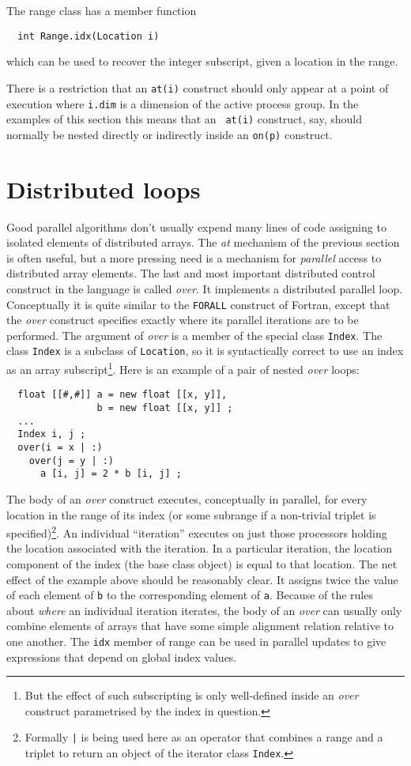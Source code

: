 The range class has a member function
\small
\begin{verbatim}
  int Range.idx(Location i)
\end{verbatim}
\normalsize
which can be used to recover the integer subscript, given a
location in the range.

There is a restriction that an {\tt at(i)} construct should only appear
at a point of execution where {\tt i.dim} is a dimension of the active
process group.  In the examples of this section this means that an {\tt
at(i)} construct, say, should normally be nested directly or indirectly
inside an {\tt on(p)} construct.

\section{Distributed loops}

Good parallel algorithms don't usually
expend many lines of code assigning to isolated elements of distributed
arrays.  The {\em at} mechanism of the previous section is
often useful, but a more pressing need is
a mechanism for {\em parallel} access to distributed array elements.
The last and most important distributed control construct in the language
is called {\em over}.
It implements a distributed parallel loop.  Conceptually it is quite
similar to the {\tt FORALL} construct of Fortran, except that the
{\em over} construct specifies exactly where its parallel iterations
are to be performed.
The argument of {\em over} is a member of the special class {\tt Index}.
The class {\tt Index} is a subclass of {\tt Location}, so it is syntactically
correct to use an index as an array subscript\footnote{But the effect
of such subscripting is only well-defined inside an {\em over} construct
parametrised by the index in question.}.  Here is an example of
a pair of nested {\em over} loops:
\small
\begin{verbatim}
  float [[#,#]] a = new float [[x, y]],
                b = new float [[x, y]] ;
  ...
  Index i, j ;
  over(i = x | :)
    over(j = y | :)
      a [i, j] = 2 * b [i, j] ;
\end{verbatim}
\normalsize
The body of an {\em over} construct executes, conceptually in parallel,
for every location in the range of its index (or some subrange if a
non-trivial triplet is specified)\footnote{Formally {\tt |} is being
used here as an operator that combines a range and a triplet to return
an object of the iterator class {\tt Index}.}.  An individual
``iteration'' executes on just those processors holding the location
associated with the iteration.  In a particular iteration, the location
component of the index (the base class object) is equal to that
location.  The net effect of the example above should be reasonably
clear.  It assigns twice the value of each element of {\tt b} to the
corresponding element of {\tt a}.  Because of the rules about {\em
where} an individual iteration iterates, the body of an {\em over} can
usually only combine elements of arrays that have some simple
alignment relation relative to one another.  The {\tt idx} member of
range can be used in parallel updates to give expressions that depend
on global index values.

